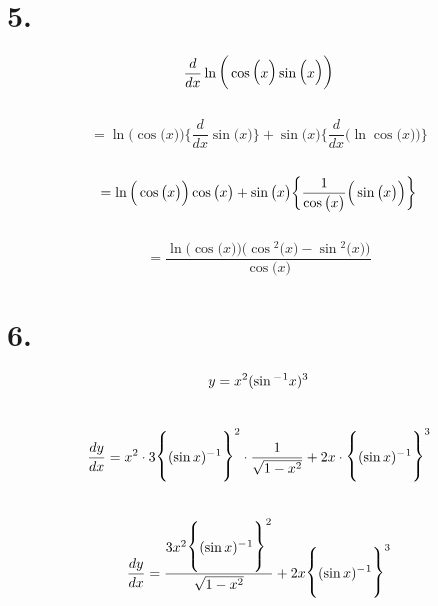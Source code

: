 \documentclass[a4paper]{article}
\begin{document}
\section*{5.}
$$\Large \frac{d}{dx}\ln \Big(\cos{\big(x \big)}\sin{\big(x \big)}\Big)$$
\\
$$ = \ln \Big(\cos{\big(x \big)}\Big) \bigg\{ \frac{d}{dx} \sin{\big(x \big)}\bigg\} + \sin{\big(x \big)} \bigg\{ \frac{d}{dx} \Big( \ln \cos {\big(x \big)}\Big)\bigg\} $$
\\
$$ = \ln \Big(\cos{\big(x \big)}\Big) \cos{\big(x \big)} + \sin{\big(x \big)} \bigg\{ \frac{1}{\cos\big( x \big)} \Big( \- \sin \big( x \big) \Big) \bigg\} $$
\\
$$ = \frac{\ln \Big(\cos{\big(x \big)}\Big) \Big( \cos{^2}{\big(x \big)} - \sin{^2}{\big(x \big)}\Big)}{\cos{\big(x \big)}}$$

\newpage
\section*{6.}
$$ \Large y = x^2 (\sin{^-{^1}}x)^3 $$
\\
$$ \Large \frac{dy}{dx} = x^2\cdot 3 \bigg\{(\sin{x})^-{^1}\bigg\}^2 \cdot \frac{1}{\sqrt{1-x^2}} + 2x \cdot \bigg\{(\sin{x})^-{^1}\bigg\}^3 $$
\\
$$\Large \frac{dy}{dx} = \frac{3x^2\bigg\{(\sin{x})^-{^1}\bigg\}^2}{\sqrt{1-x^2}} + 2x \bigg\{(\sin{x})^-{^1}\bigg\}^3 $$
\end{document}
